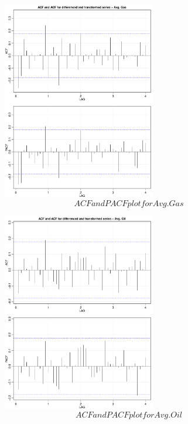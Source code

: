 \documentclass[a4paper]{article}
\begin{document}
\begin{figure}
	\centering
	\includegraphics[width=0.6\textwidth]{acf2_gas}
	\caption{$$ACF and PACF plot for Avg. Gas$$}
	\label{fig1:acf2_gas}
\end{figure}
\begin{figure}
	\centering
	\includegraphics[width=0.6\textwidth]{acf2_oil}
	\caption{$$ACF and PACF plot for Avg. Oil$$}
	\label{fig1:acf2_oil}
\end{figure}
\end{document}
